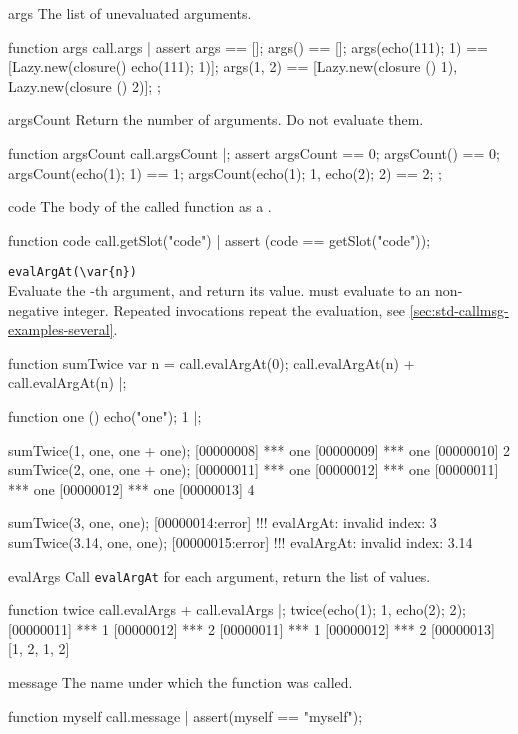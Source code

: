 \begin{urbiscriptapi}
\item[args]
  The list of unevaluated arguments.
\begin{urbiscript}
function args { call.args }|
assert
{
  args == [];
  args() == [];
  args({echo(111); 1}) == [Lazy.new(closure() {echo(111); 1})];
  args(1, 2) == [Lazy.new(closure () {1}),
                 Lazy.new(closure () {2})];
};
\end{urbiscript}


\item[argsCount]
  Return the number of arguments.  Do not evaluate them.
\begin{urbiscript}
function argsCount { call.argsCount }|;
assert
{
  argsCount == 0;
  argsCount() == 0;
  argsCount({echo(1); 1}) == 1;
  argsCount({echo(1); 1}, {echo(2); 2}) == 2;
};
\end{urbiscript}

\item[code]
  The body of the called function as a .
\begin{urbiscript}
function code { call.getSlot("code") }|
assert (code == getSlot("code"));
\end{urbiscript}

\item \lstinline|evalArgAt(\var{n})|\\
  Evaluate the -th argument, and return its value.  
  must evaluate to an non-negative integer.  Repeated invocations
  repeat the evaluation, see
  \autoref{sec:std-callmsg-examples-several}.
\begin{urbiscript}
function sumTwice
{
  var n = call.evalArgAt(0);
  call.evalArgAt(n) + call.evalArgAt(n)
}|;

function one () { echo("one"); 1 }|;

sumTwice(1, one, one + one);
[00000008] *** one
[00000009] *** one
[00000010] 2
sumTwice(2, one, one + one);
[00000011] *** one
[00000012] *** one
[00000011] *** one
[00000012] *** one
[00000013] 4

sumTwice(3, one, one);
[00000014:error] !!! evalArgAt: invalid index: 3
sumTwice(3.14, one, one);
[00000015:error] !!! evalArgAt: invalid index: 3.14
\end{urbiscript}

\item[evalArgs]
  Call \lstinline|evalArgAt| for each argument, return the list of
  values.
\begin{urbiscript}
function twice
{
  call.evalArgs + call.evalArgs
}|;
twice({echo(1); 1}, {echo(2); 2});
[00000011] *** 1
[00000012] *** 2
[00000011] *** 1
[00000012] *** 2
[00000013] [1, 2, 1, 2]
\end{urbiscript}

\item[message]
  The name under which the function was called.
\begin{urbiscript}
function myself { call.message }|
assert(myself == "myself");
\end{urbiscript}

\end{urbiscriptapi}



